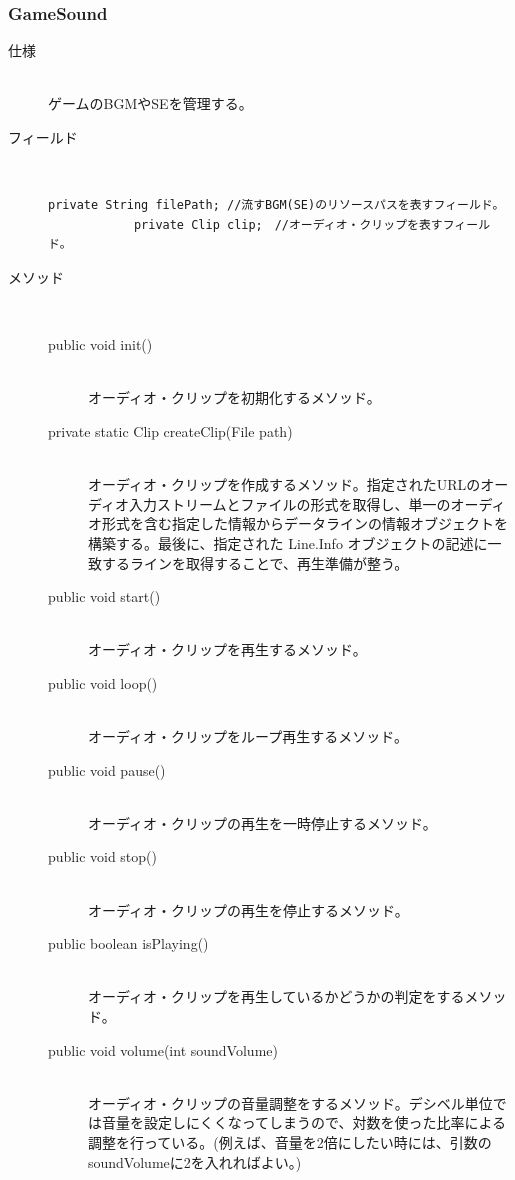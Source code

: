 \documentclass[11pt,a4j]{jarticle}
\begin{document}
\subsubsection{GameSound}
\begin{description}
    \item[仕様]\mbox{}\\
          ゲームのBGMやSEを管理する。
    \item[フィールド]\mbox{}\\
          \begin{lstlisting}[caption=uectd.gameSystem.util,label=GameSound, numbers=none]
            private String filePath; //流すBGM(SE)のリソースパスを表すフィールド。
            private Clip clip;　//オーディオ・クリップを表すフィールド。
                \end{lstlisting}
    \item[メソッド]\mbox{}\\
          \begin{description}
              \item[public void init()]\mbox{}\\
                    オーディオ・クリップを初期化するメソッド。
              \item[private static Clip createClip(File path)]\mbox{}\\
                    オーディオ・クリップを作成するメソッド。指定されたURLのオーディオ入力ストリームとファイルの形式を取得し、単一のオーディオ形式を含む指定した情報からデータラインの情報オブジェクトを構築する。最後に、指定された Line.Info オブジェクトの記述に一致するラインを取得することで、再生準備が整う。
              \item[public void start()]\mbox{}\\
                    オーディオ・クリップを再生するメソッド。
              \item[public void loop()]\mbox{}\\
                    オーディオ・クリップをループ再生するメソッド。
              \item[public void pause()] \mbox{}\\
                    オーディオ・クリップの再生を一時停止するメソッド。
              \item[public void stop()] \mbox{}\\
                    オーディオ・クリップの再生を停止するメソッド。
              \item[public boolean isPlaying()] \mbox{}\\
                    オーディオ・クリップを再生しているかどうかの判定をするメソッド。
              \item[public void volume(int soundVolume)] \mbox{}\\
                    オーディオ・クリップの音量調整をするメソッド。デシベル単位では音量を設定しにくくなってしまうので、対数を使った比率による調整を行っている。(例えば、音量を2倍にしたい時には、引数のsoundVolumeに2を入れればよい。)
          \end{description}
\end{description}
\end{document}
